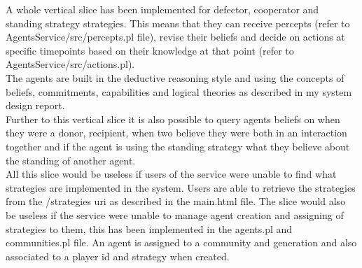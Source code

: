 \documentclass[]{final_report}
\begin{document}
A whole vertical slice has been implemented for defector, cooperator and standing strategy strategies. This means that they can receive percepts (refer to AgentsService/src/percepts.pl file), revise their beliefs and decide on actions at specific timepoints based on their knowledge at that point (refer to AgentsService/src/actions.pl).\\
The agents are built in the deductive reasoning style and using the concepts of beliefs, commitments, capabilities and logical theories as described in my system design report.\\
Further to this vertical slice it is also possible to query agents beliefs on when they were a donor, recipient, when two believe they were both in an interaction together and if the agent is using the standing strategy what they believe about the standing of another agent.\\
All this slice would be useless if users of the service were unable to find what strategies are implemented in the system. Users are able to retrieve the strategies from the /strategies uri as described in the main.html file. The slice would also be useless if the service were unable to manage agent creation and assigning of strategies to them, this has been implemented in the agents.pl and communities.pl file. An agent is assigned to a community and generation and also associated to a player id and strategy when created.
\end{document}
